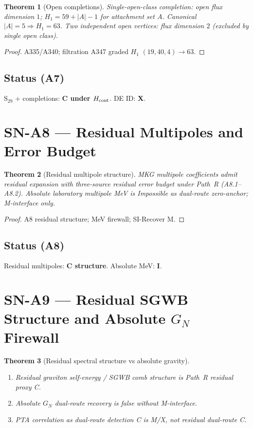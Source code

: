\documentclass[11pt,a4paper]{article}
\newtheorem{theorem}{Theorem}[section]
\theoremstyle{definition}
\begin{document}
\begin{theorem}[Open completions]
\label{thm:A7}
Single-open-class completion: open flux dimension $1$;
$H_1=59+|A|-1$ for attachment set $A$. Canonical $|A|=5\Rightarrow H_1=63$.
Two independent open vertices: flux dimension $2$ (excluded by single open class).
\end{theorem}

\begin{proof}
A335/A340; filtration A347 graded $H_1$ $(19,40,4)\to 63$.
\end{proof}

\subsection*{Status (A7)} $\mathrm{S}_{29}$ + completions: \textbf{C under $H_{\rm cont}$}. DE ID: \textbf{X}.

\section{SN-A8 --- Residual Multipoles and Error Budget}
\label{sec:SNA8}

\begin{theorem}[Residual multipole structure]
\label{thm:A8}
MKG multipole coefficients admit residual expansion with three-source residual error budget
under Path~R (A8.1--A8.2). Absolute laboratory multipole MeV is Impossible as dual-route zero-anchor;
M-interface only.
\end{theorem}

\begin{proof}
A8 residual structure; MeV firewall; SI-Recover M.
\end{proof}

\subsection*{Status (A8)} Residual multipoles: \textbf{C structure}. Absolute MeV: \textbf{I}.

\section{SN-A9 --- Residual SGWB Structure and Absolute $G_N$ Firewall}
\label{sec:SNA9}

\begin{theorem}[Residual spectral structure vs absolute gravity]
\label{thm:A9}
\begin{enumerate}[label=(\roman*)]
\item Residual graviton self-energy / SGWB comb structure is Path~R residual proxy C.
\item Absolute $G_N$ dual-route recovery is false without M-interface.
\item PTA correlation as dual-route detection C is M/X, not residual dual-route C.
\end{enumerate}
\end{theorem}
\end{document}
